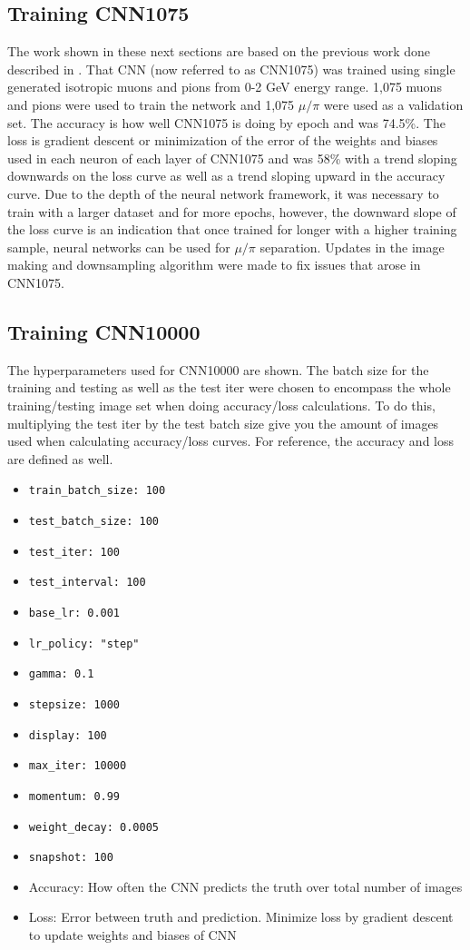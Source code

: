 \subsection{Training CNN1075}
The work shown in these next sections are based on the previous work done described in \cite{priorwork}. That CNN (now referred to as CNN1075) was trained using single generated isotropic muons and pions from 0-2 GeV energy range. 1,075 muons and pions were used to train the network and 1,075 $\mu/\pi$ were used as a validation set. The accuracy is how well CNN1075 is doing by epoch and was 74.5\%. The loss is gradient descent or minimization of the error of the weights and biases used in each neuron of each layer of CNN1075 and was 58\% with a trend sloping downwards on the loss curve as well as a trend sloping upward in the accuracy curve. Due to the depth of the neural network framework, it was necessary to train with a larger dataset and for more epochs, however, the downward slope of the loss curve is an indication that once trained for longer with a higher training sample, neural networks can be used for $\mu/\pi$ separation. Updates in the image making and downsampling algorithm were made to fix issues that arose in CNN1075. 
\subsection{Training CNN10000}
The hyperparameters used for CNN10000 are shown. The batch size for the training and testing as well as the test iter were chosen to encompass the whole training/testing image set when doing accuracy/loss calculations. To do this, multiplying the test iter by the test batch size give you the amount of images used when calculating accuracy/loss curves. For reference, the accuracy and loss are defined as well. 


\begin{itemize}
 \item \verb|train_batch_size: 100|
 \item \verb|test_batch_size: 100|
 \item \verb|test_iter: 100|
 \item \verb|test_interval: 100|
 \item \verb|base_lr: 0.001|
 \item \verb|lr_policy: "step"|
 \item \verb|gamma: 0.1|
 \item \verb|stepsize: 1000|
 \item \verb|display: 100|
 \item \verb|max_iter: 10000|
 \item \verb|momentum: 0.99|
 \item \verb|weight_decay: 0.0005|
 \item \verb|snapshot: 100|
\item Accuracy: How often the CNN predicts the truth over total number of images
\item Loss: Error between truth and prediction. Minimize loss by gradient descent to update weights and biases of CNN
\end{itemize}

